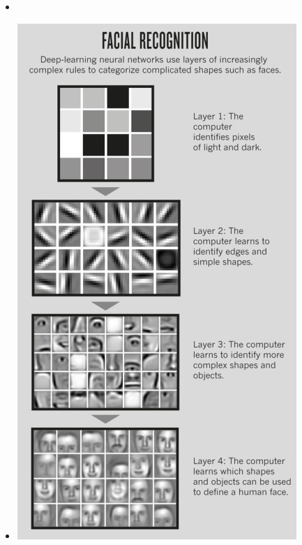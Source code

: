 \documentclass[xcolor=pdftex,x11names,table,hyperref]{beamer}
\begin{document}
\begin{frame}{}
\begin{itemize}
	\item 
	\item 
	\begin{center}
	\includegraphics[height=0.80\textheight]{images/deep_cnn_face.jpg}
	\end{center}
\end{itemize}
\end{frame}
\end{document}
